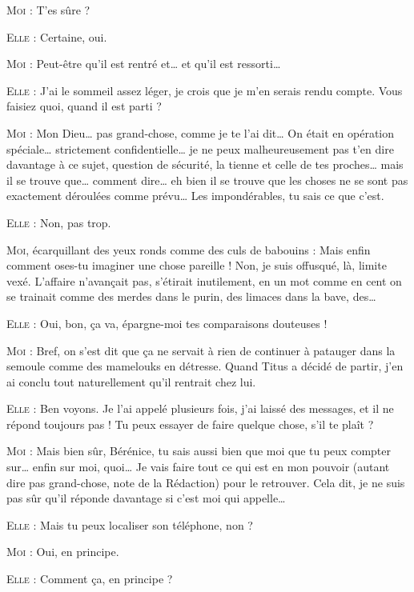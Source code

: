 \begin{dialogue}
\textsc{Moi} : T’es sûre ?

\textsc{Elle} : Certaine, oui.

\textsc{Moi} : Peut-être qu’il est rentré et… et qu’il est ressorti…

\textsc{Elle} : J’ai le sommeil assez léger, je crois que je m’en serais rendu compte. Vous faisiez quoi, quand il est parti ?

\textsc{Moi} : Mon Dieu… pas grand-chose, comme je te l’ai dit… On était en opération spéciale… strictement confidentielle… je ne peux malheureusement pas t’en dire davantage à ce sujet, question de sécurité, la tienne et celle de tes proches… mais il se trouve que… comment dire… eh bien il se trouve que les choses ne se sont pas exactement déroulées comme prévu… Les impondérables, tu sais ce que c’est.

\textsc{Elle} : Non, pas trop. 

\textsc{Moi}, écarquillant des yeux ronds comme des culs de babouins :  Mais enfin comment oses-tu imaginer une chose pareille ! Non, je suis offusqué, là, limite vexé. L’affaire n’avançait pas, s’étirait inutilement, en un mot comme en cent on se trainait comme des merdes dans le purin, des limaces dans la bave, des…

\textsc{Elle} : Oui, bon, ça va, épargne-moi tes comparaisons douteuses !

\textsc{Moi} : Bref, on s’est dit que ça ne servait à rien de continuer à patauger dans la semoule comme des mamelouks en détresse. Quand Titus a décidé de partir, j’en ai conclu tout naturellement qu’il rentrait chez lui.

\textsc{Elle} : Ben voyons. Je l’ai appelé plusieurs fois, j’ai laissé des messages, et il ne répond toujours pas ! Tu peux essayer de faire quelque chose, s’il te plaît ?

\textsc{Moi} : Mais bien sûr, Bérénice, tu sais aussi bien que moi que tu peux compter sur… enfin sur moi, quoi… Je vais faire tout ce qui est en mon pouvoir (autant dire pas grand-chose, note de la Rédaction) pour le retrouver. Cela dit, je ne suis pas sûr qu’il réponde davantage si c’est moi qui appelle…

\textsc{Elle} : Mais tu peux localiser son téléphone, non ?

\textsc{Moi} : Oui, en principe.

\textsc{Elle} : Comment ça, en principe ?


\end{dialogue}
